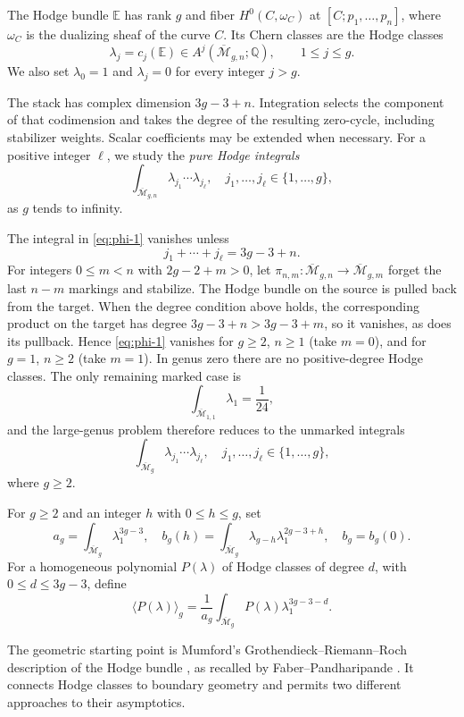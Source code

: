 \documentclass[a4paper,10pt]{article}
\numberwithin{equation}{section}
\newcommand{\MM}{\overline{\mathcal{M}}}
\newcommand{\EE}{\mathbb{E}}
\theoremstyle{paperplain}
\theoremstyle{paperremark}
\theoremstyle{paperplain}
\begin{document}
The Hodge bundle $\EE$ has rank $g$ and fiber $H^0(C,\omega_C)$ at
$[C;p_1,\ldots,p_n]$, where $\omega_C$ is the dualizing sheaf of the
curve $C$.  Its Chern classes are the Hodge classes
\[\lambda_j=c_j(\EE)\in A^j(\MM_{g,n};\mathbb Q),
\qquad 1\leq j\leq g.\]
We also set $\lambda_0=1$ and $\lambda_j=0$ for every integer $j>g$.

The stack has complex dimension $3g-3+n$.  Integration selects the
component of that codimension and takes the degree of the resulting
zero-cycle, including stabilizer weights.  Scalar
coefficients may be extended when necessary.  For a positive integer
$\ell$, we study the \emph{pure Hodge integrals}
\begin{equation}
\int_{\MM_{g,n}}\lambda_{j_1}\cdots \lambda_{j_\ell},\quad j_1, \dots, j_\ell \in \{1, \dots, g\},
\label{eq:phi-1}
\end{equation}
as $g$ tends to infinity.

The integral in \eqref{eq:phi-1} vanishes unless
\[j_1+\cdots+j_\ell=3g-3+n.\]
For integers $0\leq m<n$ with $2g-2+m>0$, let
$\pi_{n,m}:\MM_{g,n}\to\MM_{g,m}$ forget the last $n-m$ markings
and stabilize.  The Hodge bundle on the source is pulled back from the
target.  When the degree condition above holds, the corresponding
product on the target has degree $3g-3+n>3g-3+m$, so it vanishes,
as does its pullback.  Hence \eqref{eq:phi-1} vanishes for $g\geq2$,
$n\geq1$ (take $m=0$), and for $g=1$, $n\geq2$ (take $m=1$).
In genus zero there are no positive-degree Hodge classes.  The only
remaining marked case is
\[\int_{\MM_{1,1}}\lambda_1=\frac{1}{24},\]
and the large-genus problem therefore reduces to the unmarked integrals
\begin{equation}
\int_{\MM_g}\lambda_{j_1}\cdots \lambda_{j_\ell},
\quad j_1, \dots, j_\ell \in \{1, \dots, g\},
\label{eq:phi-2}
\end{equation}
where $g\ge 2$.

For $g\geq2$ and an integer $h$ with $0\leq h\leq g$, set
\[a_g=\int_{\MM_g}\lambda_1^{3g-3},\quad b_g(h)=\int_{\MM_g}\lambda_{g-h} \lambda_1^{2g-3+h},
\quad b_g=b_g(0).\]
For a homogeneous polynomial $P(\lambda)$ of Hodge classes of degree
$d$, with $0\leq d\leq3g-3$, define
\[\langle P(\lambda) \rangle_g=\frac{1}{a_g}\int_{\MM_g} P(\lambda)\lambda_1^{3g-3-d}.\]

The geometric starting point is Mumford's
Grothendieck--Riemann--Roch description of the Hodge bundle
\cite[\S 5]{Mum83}, as recalled by
Faber--Pandharipande \cite[\S 1.1]{FP00}. It connects Hodge classes
to boundary geometry and permits two different approaches to
their asymptotics.
\end{document}
